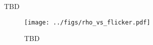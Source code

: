 
TBD

\begin{figure}
\begin{center}
\texttt{[image: ../figs/rho\_vs\_flicker.pdf]}
\caption{
TBD
} 
\label{fig:rhostar}
\end{center}
\end{figure}
